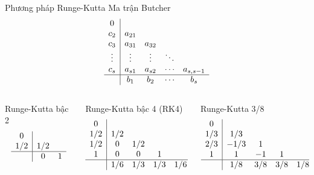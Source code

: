 \documentclass[aspectratio=169, t]{beamer} %
\begin{document}
\begin{frame}{Phương pháp Runge-Kutta}
Ma trận Butcher
\begin{equation}
\begin{array}{c|cccc}
0      &        &        &        &        \\
c_{2}  & a_{21} &        &        &        \\
c_{3}  & a_{31} & a_{32} &        &        \\
\vdots & \vdots & \vdots & \ddots &        \\
c_{s}  & a_{s1} & a_{s2} & \cdots & a_{s,s-1} \\
\hline
       & b_{1}  & b_{2}  & \cdots & b_{s}
\end{array}   
\end{equation}

\begin{columns}
    \begin{column}{0.23\textwidth}
        Runge-Kutta bậc 2
        \vspace{-3mm}
        \begin{equation*}
         \begin{array}{c|cccc}
        0 & & \\
        1/2 & 1/2 & \\
        \hline
         & 0 & 1
        \end{array}   
        \end{equation*}
    \end{column}
    
    \begin{column}{0.38\textwidth}
        Runge-Kutta bậc 4 (RK4)
        \vspace{-3mm}
        \begin{equation*}
        \begin{array}{c|cccc}
        0 & & & & \\
        1/2 & 1/2 & & & \\
        1/2 & 0 & 1/2 & & \\
        1 & 0 & 0 & 1 &\\
        \hline
         & 1/6 & 1/3 & 1/3 & 1/6
        \end{array}   
        \end{equation*}
    \end{column}

    \begin{column}{0.38\textwidth}
        Runge-Kutta 3/8
        \vspace{-3mm}
        \begin{equation*}
        \begin{array}{c|cccc}
        0 & & & & \\
        1/3 & 1/3 & & & \\
        2/3 & -1/3 & 1 & & \\
        1 & 1 & -1 & 1 &\\
        \hline
         & 1/8 & 3/8 & 3/8 & 1/8
        \end{array}   
        \end{equation*}
    \end{column}
\end{columns}


\end{frame}
\end{document}
